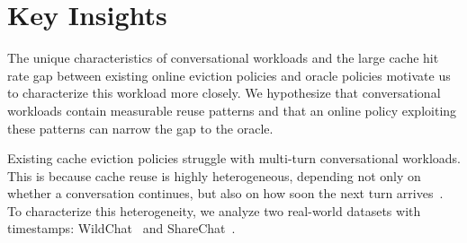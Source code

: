 \documentclass{article}
\newcommand{\jiny}[1]{\textcolor{orange}{[Jiny: #1]}}
\newcommand{\bo}[1]{\textcolor{red}{[Bo: #1]}}
\begin{document}








\vspace{-7pt}

\section{Key Insights}
\label{sec:key_insights}
\vspace{-7pt}








The unique characteristics of conversational workloads and the large cache hit rate gap between existing online eviction policies and oracle policies motivate us to characterize this workload more closely. We hypothesize that conversational workloads contain measurable reuse patterns and that an online policy exploiting these patterns can narrow the gap to the oracle.


Existing cache eviction policies struggle with multi-turn conversational workloads. This is because cache reuse is highly heterogeneous, depending not only on whether a conversation continues, but also on how soon the next turn arrives~\cite{wang2025kvcache, servegen}. To characterize this heterogeneity, we analyze two real-world datasets with timestamps: WildChat~\cite{zhao2024wildchat} and ShareChat~\cite{yan2025sharechat}.
\end{document}
